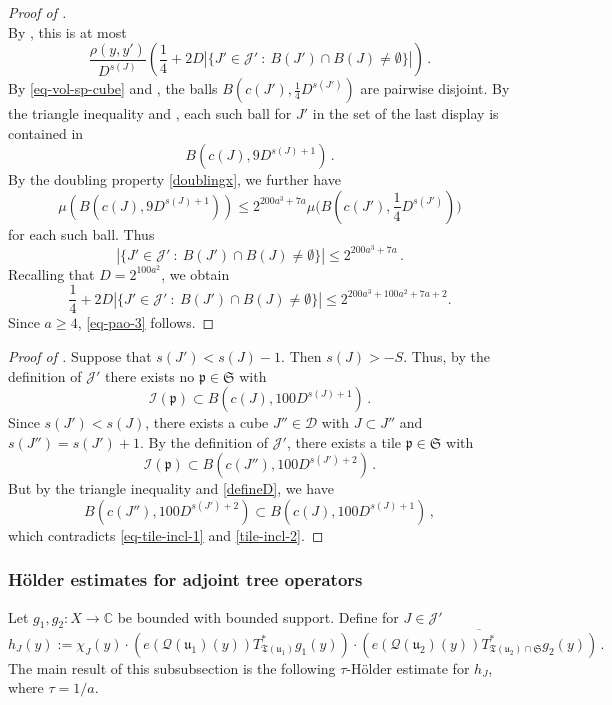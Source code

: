 \documentclass[10pt,a4paper]{article}
\theoremstyle{plain}
\theoremstyle{definition}
\numberwithin{equation}{subsection}
\newcommand{\fp}{{\mathfrak p}}
\newcommand{\fu}{{\mathfrak u}}
\newcommand{\fT}{{\mathfrak T}}
\newcommand{\scI}{{\mathcal{I}}} %
\newcommand{\fcc}{{\mathcal{Q}}}
\newcommand{\proves}[1]{}
\newcommand{\leanok}{}
\begin{document}
\begin{proof}[Proof of ]
$$        $$
        By , this is at most
        $$
             \frac{\rho(y,y')}{D^{s(J)}} \left( \frac{1}{4} + 2D |\{J' \in \mathcal{J}' \ : \ B(J') \cap B(J) \ne \emptyset\}|\right)\,.
        $$
        By \eqref{eq-vol-sp-cube} and , the balls $B(c(J'), \frac{1}{4} D^{s(J')})$ are pairwise disjoint. By the triangle inequality and , each such ball for $J'$ in the set of the last display is contained in
        $$
            B(c(J), 9 D^{s(J) + 1})\,.
        $$
        By the doubling property \eqref{doublingx}, we further have
        $$
            \mu(B(c(J), 9 D^{s(J) + 1})) \le 2^{200a^3 + 7a} \mu\Big(B(c(J'), \frac{1}{4}D^{s(J')})\Big)
        $$
        for each such ball.
        Thus
        $$
            |\{J' \in \mathcal{J}' \ : \ B(J') \cap B(J) \ne \emptyset\}| \le 2^{200a^3 + 7a}\,.
        $$
        Recalling that $D=2^{100a^2}$, we obtain
        $$\frac{1}{4} + 2D |\{J' \in \mathcal{J}' \ : \ B(J') \cap B(J) \ne \emptyset\}|\leq 2^{200a^3 + 100a^2 + 7a + 2}.$$
        Since $a\ge 4$, \eqref{eq-pao-3} follows.
    \end{proof}

    \begin{proof}[Proof of ]
        \leanok
        \proves{moderate-scale-change}
        Suppose that $s(J') < s(J) - 1$. Then $s(J) > -S$. Thus, by the definition of $\mathcal{J}'$ there exists no $\fp \in \mathfrak{S}$ with
      \begin{equation}
            \label{eq-tile-incl-1}
            \scI(\fp) \subset B(c(J), 100D^{s(J) + 1})\,.
        \end{equation}
        Since $s(J') < s(J)$, there exists a cube $J'' \in \mathcal{D}$ with $J \subset J''$ and $s(J'') = s(J') + 1$. By the definition of $\mathcal{J}'$, there exists a tile $\fp \in \mathfrak{S}$ with
      \begin{equation}
            \label{tile-incl-2}
            \scI(\fp) \subset B(c(J''), 100 D^{s(J')+2})\,.
        \end{equation}
        But by the triangle inequality and \eqref{defineD}, we have
        $$
            B(c(J''), 100 D^{s(J')+2}) \subset B(c(J), 100D^{s(J) + 1})\,,
        $$
        which contradicts \eqref{eq-tile-incl-1} and \eqref{tile-incl-2}.
    \end{proof}


\subsubsection{H\"older estimates for adjoint tree operators}
\label{subsubsec-holder-estimates}
    Let $g_1, g_2:X \to \mathbb{C}$ be bounded with bounded support.
    Define for $J \in \mathcal{J}'$
    \begin{equation}
        \label{def-hj}
        h_J(y) := \chi_J(y)\cdot(e(\fcc(\fu_1)(y)) T_{\fT(\fu_1)}^* g_1(y)) \cdot \overline{(e(\fcc(\fu_2)(y)) T_{\fT(\fu_2) \cap \mathfrak{S}}^* g_2(y))}\,.
    \end{equation}
    The main result of this subsubsection is the following $\tau$-H\"older estimate for $h_J$, where $\tau = 1/a$.
\end{document}
